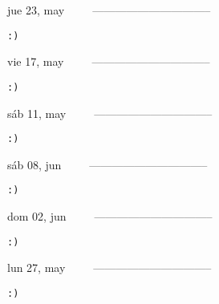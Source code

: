 \documentclass[letterpaper,10pt]{article}
\begin{document}
\begin{multicols}{3}
{jue 23, may\ \ \ \ \ --------------------------------}
\begin{flushright}\begin{small}\texttt{:)}\end{small}\end{flushright}
\vfill
{vie 17, may\ \ \ \ \ --------------------------------}
\begin{flushright}\begin{small}\texttt{:)}\end{small}\end{flushright}\par
\vfill
{sáb 11, may\ \ \ \ \ --------------------------------}
\begin{flushright}\begin{small}\texttt{:)}\end{small}\end{flushright}\par
\vfill
\end{multicols}
\vspace{1.05cm}

\begin{multicols}{3}
{sáb 08, jun\ \ \ \ \ --------------------------------}
\begin{flushright}\begin{small}\texttt{:)}\end{small}\end{flushright}
\vfill
{dom 02, jun\ \ \ \ \ --------------------------------}
\begin{flushright}\begin{small}\texttt{:)}\end{small}\end{flushright}\par
\vfill
{lun 27, may\ \ \ \ \ --------------------------------}
\begin{flushright}\begin{small}\texttt{:)}\end{small}\end{flushright}\par
\vfill
\end{multicols}
\vspace{1.05cm}
\end{document}
